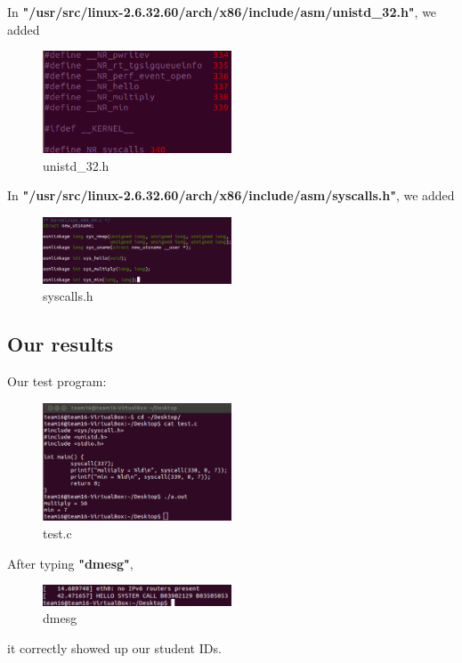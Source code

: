 \documentclass{article}
\newcommand{\tb}{\textbf}
\begin{document}
In \tb{"/usr/src/linux-2.6.32.60/arch/x86/include/asm/unistd\_32.h"}, we added

\begin{figure}[!htb]
    \centering
    \includegraphics[width=0.5\textwidth]{img/unistd_32.png}
    \caption{unistd\_32.h}
\end{figure}

\newpage
In \tb{"/usr/src/linux-2.6.32.60/arch/x86/include/asm/syscalls.h"}, we added

\begin{figure}[!htb]
    \centering
    \includegraphics[width=0.5\textwidth]{img/syscalls.png}
    \caption{syscalls.h}
\end{figure}

\subsection*{Our results}

Our test program:

\begin{figure}[!htb]
    \centering
    \includegraphics[width=0.5\textwidth]{img/test.png}
    \caption{test.c}
\end{figure}

After typing \tb{"dmesg"},

\begin{figure}[!htb]
    \centering
    \includegraphics[width=0.5\textwidth]{img/studentID.png}
    \caption{dmesg}
\end{figure}

it correctly showed up our student IDs.
\end{document}

